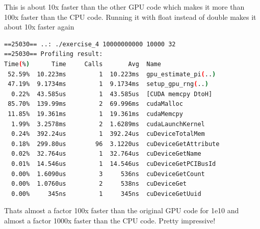\documentclass{article}
\begin{document}
This is about 10x faster than the other GPU code which makes it more than 100x faster than the CPU code. Running it with float instead of double makes it about
10x faster again

\begin{mdframed}[backgroundcolor=codeColor,leftmargin=0.0cm,hidealllines=true,%
  innerleftmargin=0.1cm,innerrightmargin=0.1cm,innertopmargin=0.5cm,innerbottommargin=0.10cm,
  roundcorner=15pt]
\begin{lstlisting}[language=bash]
==25030== ..: ./exercise_4 10000000000 10000 32
==25030== Profiling result:
Time(%)      Time     Calls       Avg  Name
 52.59%  10.223ms         1  10.223ms  gpu_estimate_pi(..)
 47.19%  9.1734ms         1  9.1734ms  setup_gpu_rng(..)
  0.22%  43.585us         1  43.585us  [CUDA memcpy DtoH]
 85.70%  139.99ms         2  69.996ms  cudaMalloc
 11.85%  19.361ms         1  19.361ms  cudaMemcpy
  1.99%  3.2578ms         2  1.6289ms  cudaLaunchKernel
  0.24%  392.24us         1  392.24us  cuDeviceTotalMem
  0.18%  299.80us        96  3.1220us  cuDeviceGetAttribute
  0.02%  32.764us         1  32.764us  cuDeviceGetName
  0.01%  14.546us         1  14.546us  cuDeviceGetPCIBusId
  0.00%  1.6090us         3     536ns  cuDeviceGetCount
  0.00%  1.0760us         2     538ns  cuDeviceGet
  0.00%     345ns         1     345ns  cuDeviceGetUuid
\end{lstlisting}
\end{mdframed}

Thats almost a factor 100x faster than the original GPU code for 1e10 and almost a factor 1000x faster than the CPU code. Pretty impressive!
\end{document}
